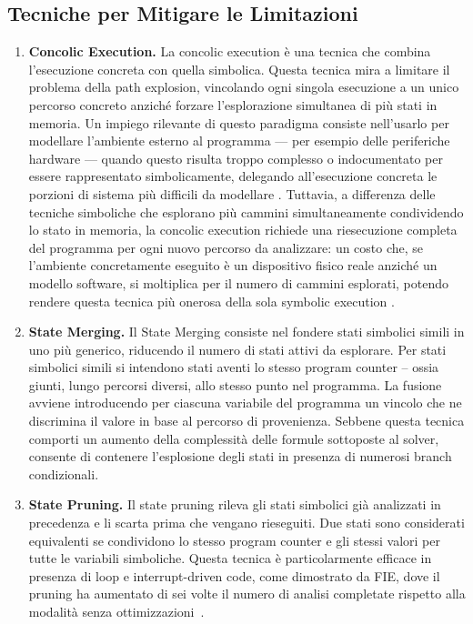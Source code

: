 \subsection{Tecniche per Mitigare le Limitazioni}
\label{subsec:tecniche_per_mitigare_le_limitazioni}
\begin{enumerate}
    \item \textbf{Concolic Execution.} La concolic execution è una tecnica che combina l'esecuzione concreta con quella simbolica. Questa tecnica mira a limitare il problema della path explosion, vincolando ogni singola esecuzione a un unico percorso concreto anziché forzare l'esplorazione simultanea di più stati in memoria. Un impiego rilevante di questo paradigma consiste nell'usarlo per modellare l'ambiente esterno al programma — per esempio delle periferiche hardware — quando questo risulta troppo complesso o indocumentato per essere rappresentato simbolicamente, delegando all'esecuzione concreta le porzioni di sistema più difficili da modellare \cite{chipounov2011s2e}. Tuttavia, a differenza delle tecniche simboliche che esplorano più cammini simultaneamente condividendo lo stato in memoria, la concolic execution richiede una riesecuzione completa del programma per ogni nuovo percorso da analizzare: un costo che, se l'ambiente concretamente eseguito è un dispositivo fisico reale anziché un modello software, si moltiplica per il numero di cammini esplorati, potendo rendere questa tecnica più onerosa della sola symbolic execution \cite{cha2012mayhem}.
    
    \item \textbf{State Merging.} Il State Merging consiste nel fondere stati simbolici simili in uno più generico, riducendo il numero di stati attivi da esplorare. Per stati simbolici simili si intendono stati aventi lo stesso program counter -- ossia giunti, lungo percorsi diversi, allo stesso punto nel programma. La fusione avviene introducendo per ciascuna variabile del programma un vincolo che ne discrimina il valore in base al percorso di provenienza. Sebbene questa tecnica comporti un aumento della complessità delle formule sottoposte al solver, consente di contenere l'esplosione degli stati in presenza di numerosi branch condizionali.
    \item \textbf{State Pruning.} Il state pruning rileva gli stati simbolici già analizzati in precedenza e li scarta prima che vengano rieseguiti. Due stati sono considerati equivalenti se condividono lo stesso program counter e gli stessi valori per tutte le variabili simboliche. Questa tecnica è particolarmente efficace in presenza di loop e interrupt-driven code, come dimostrato da FIE, dove il pruning ha aumentato di sei volte il numero di analisi completate rispetto alla modalità senza ottimizzazioni~\cite{davidson2013fie}.
\end{enumerate}

